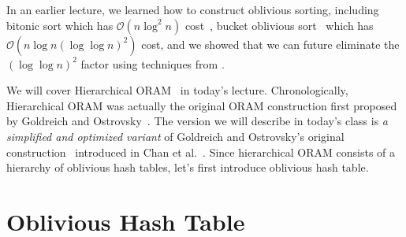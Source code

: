 \newcommand{\rsmpl}{\xleftarrow{\$}}

\newcommand{\alg}{\textsc{Alg}}

\newcommand{\ap}{\textsc{AccessPattern}}
\newtheorem{nonexample}[theorem]{Non-Example}


In an earlier lecture, we learned how to construct oblivious sorting, including bitonic sort which has $\mathcal{O}(n \log^2 n)$ cost~\cite{Batcher}, bucket oblivious sort~\cite{bucket} which has $\mathcal{O}(n \log n (\log \log n)^2)$ cost, 
and we showed that we can future eliminate the $(\log \log n)^2$ factor using
techniques from 
\cite{domulticore, tianyao-sort}.

We will cover Hierarchical ORAM~\cite{10.1145/233551.233553} 
in today's lecture.
Chronologically, 
Hierarchical ORAM 
was actually the original ORAM construction  
first proposed by Goldreich and Ostrovsky~\cite{10.1145/233551.233553}. 
The version we will describe in today's class
is {\it a simplified and optimized variant} of Goldreich and Ostrovsky's original
construction~\cite{10.1145/233551.233553}
introduced in Chan et al.~\cite{ohash}.
Since hierarchical ORAM consists of a hierarchy of oblivious hash tables,
let's first introduce oblivious hash table.

\section{Oblivious Hash Table}

